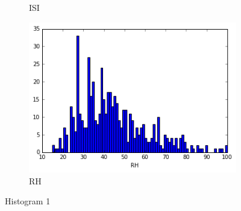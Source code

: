\begin{figure}[!ht]
\begin{subfigure}[b]{.45\linewidth}
\caption{ISI}\label{fig:tiger}
\end{subfigure}
\begin{subfigure}[b]{.45\linewidth}
\includegraphics[width=\linewidth]{fig/hist/RH.png}
\caption{RH}\label{fig:tiger}
\end{subfigure}
\caption{Histogram 1}
\end{figure}

